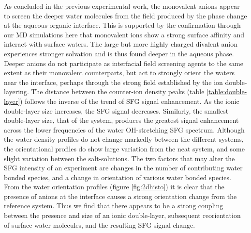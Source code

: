 As concluded in the previous experimental work, the monovalent anions appear to screen the deeper water molecules from the field produced by the phase change at the aqueous-organic interface. This is supported by the confirmation through our MD simulations here that monovalent ions show a strong surface affinity and interact with surface waters. The large but more highly charged divalent \sul anion experiences stronger solvation and is thus found deeper in the aqueous phase. Deeper anions do not participate as interfacial field screening agents to the same extent as their monovalent counterparts, but act to strongly orient the waters near the interface, perhaps through the strong field established by the ion double-layering. The distance between the counter-ion density peaks (table \ref{table:double-layer}) follows the inverse of the trend of SFG signal enhancement. As the ionic double-layer size increases, the SFG signal decreases. Similarly, the smallest double-layer size, that of the \sul system, produces the greatest signal enhancement across the lower frequencies of the water OH-stretching SFG spectrum. Although the water density profiles do not change markedly between the different systems, the orientational profiles do show large variation from the neat \ctcwat system, and some slight variation between the salt-solutions. The two factors that may alter the SFG intensity of an experiment are changes in the number of contributing water bonded species, and a change in orientation of various water bonded species. From the water orientation profiles (figure \ref{fig:2dhisto}) it is clear that the presence of anions at the \ctcwat interface causes a strong orientation change from the reference \ctcwat system. Thus we find that there appears to be a strong coupling between the presence and size of an ionic double-layer, subsequent reorientation of surface water molecules, and the resulting SFG signal change.
